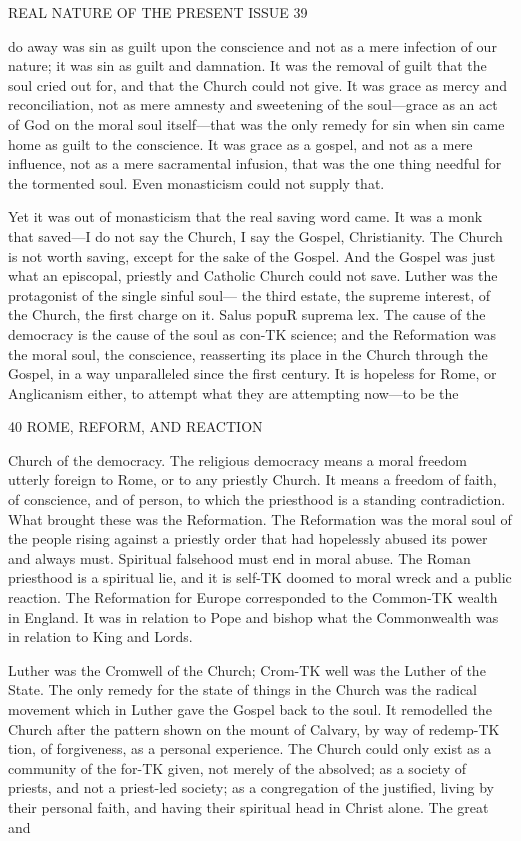 \documentclass[12pt,a5paper,oneside]{book}
\begin{document}
REAL NATURE OF THE PRESENT ISSUE 39 

do away was sin as guilt upon the conscience and not 
as a mere infection of our nature; it was sin as guilt 
and damnation. It was the removal of guilt that the 
soul cried out for, and that the Church could not give. 
It was grace as mercy and reconciliation, not as mere 
amnesty and sweetening of the soul---grace as an 
act of God on the moral soul itself---that was the only 
remedy for sin when sin came home as guilt to the 
conscience. It was grace as a gospel, and not as 
a mere influence, not as a mere sacramental infusion, 
that was the one thing needful for the tormented soul. 
Even monasticism could not supply that. 

Yet it was out of monasticism that the real saving 
word came. It was a monk that saved---I do not 
say the Church, I say the Gospel, Christianity. 
The Church is not worth saving, except for the sake 
of the Gospel. And the Gospel was just what an 
episcopal, priestly and Catholic Church could not save. 
Luther was the protagonist of the single sinful soul---
the third estate, the supreme interest, of the Church, 
the first charge on it. Salus popuR suprema lex. The 
cause of the democracy is the cause of the soul as con-TK
science; and the Reformation was the moral soul, the 
conscience, reasserting its place in the Church through 
the Gospel, in a way unparalleled since the first century. 
It is hopeless for Rome, or Anglicanism either, to 
attempt what they are attempting now---to be the 



40 ROME, REFORM, AND REACTION 

Church of the democracy. The religious democracy 
means a moral freedom utterly foreign to Rome, or to 
any priestly Church. It means a freedom of faith, of 
conscience, and of person, to which the priesthood is 
a standing contradiction. What brought these was 
the Reformation. The Reformation was the moral 
soul of the people rising against a priestly order that 
had hopelessly abused its power and always must. 
Spiritual falsehood must end in moral abuse. The 
Roman priesthood is a spiritual lie, and it is self-TK
doomed to moral wreck and a public reaction. The 
Reformation for Europe corresponded to the Common-TK
wealth in England. It was in relation to Pope and 
bishop what the Commonwealth was in relation to 
King and Lords. 

Luther was the Cromwell of the Church; Crom-TK
well was the Luther of the State. The only remedy 
for the state of things in the Church was the radical 
movement which in Luther gave the Gospel back to 
the soul. It remodelled the Church after the pattern 
shown on the mount of Calvary, by way of redemp-TK
tion, of forgiveness, as a personal experience. The 
Church could only exist as a community of the for-TK
given, not merely of the absolved; as a society of priests, 
and not a priest-led society; as a congregation of the 
justified, living by their personal faith, and having 
their spiritual head in Christ alone. The great and 
\end{document}
